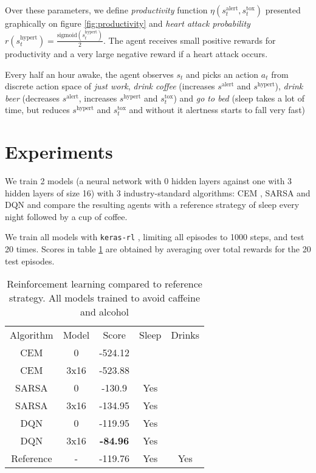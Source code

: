 Over these parameters, we define \emph{productivity} function $\eta(s^\text{alert}_t, s^\text{tox}_t)$ presented graphically on figure \ref{fig:productivity} and \emph{heart attack probability} $r(s^\text{hypert}_t)=\frac{\text{sigmoid}(s^\text{hypert}_t)}{2}$.
The agent receives small positive rewards for productivity and a very large negative reward if a heart attack occurs.

Every half an hour awake, the agent observes $s_t$ and picks an action $a_t$ from discrete action space of \emph{just work}, \emph{drink coffee} (increases $s^\text{alert}$ and $s^\text{hypert}$), \emph{drink beer} (decreases $s^\text{alert}$, increases $s^\text{hypert}$ and $s^\text{tox}_t$) and \emph{go to bed} (sleep takes a lot of time, but reduces $s^\text{hypert}$ and $s^\text{tox}_t$ and without it alertness starts to fall very fast)

\section{Experiments}
\label{sec:heartpole-experiments}


We train 2 models (a neural network with 0 hidden layers against one with 3 hidden layers of size 16) with 3 industry-standard algorithms: CEM \cite{cem}, SARSA \cite[Chapter 6]{thebook} and DQN \cite{dqn1,dqn2} and compare the resulting agents with a reference strategy of sleep every night followed by a cup of coffee.

We train all models with \texttt{keras-rl} \cite{kerasrl}, limiting all episodes to 1000 steps, and test 20 times.
Scores in table \ref{tab:heartpole-results} are obtained by averaging over total rewards for the 20 test episodes.

\begin{table}[]
    \centering
    \begin{tabular}{c|c|c|c|c}
         Algorithm & Model & Score & Sleep & Drinks \\
         CEM & 0 & -524.12 &  &   \\
         CEM & 3x16 & -523.88 & & \\
         SARSA & 0 & -130.9 & Yes & \\
         SARSA & 3x16 & -134.95 & Yes & \\
         DQN & 0 & -119.95 & Yes &  \\
         DQN & 3x16 & \textbf{-84.96} & Yes &  \\
         Reference & - & -119.76 & Yes & Yes 
    \end{tabular}
    \caption{Reinforcement learning compared to reference strategy. All models trained to avoid caffeine and alcohol}
    \label{tab:heartpole-results}
\end{table}

